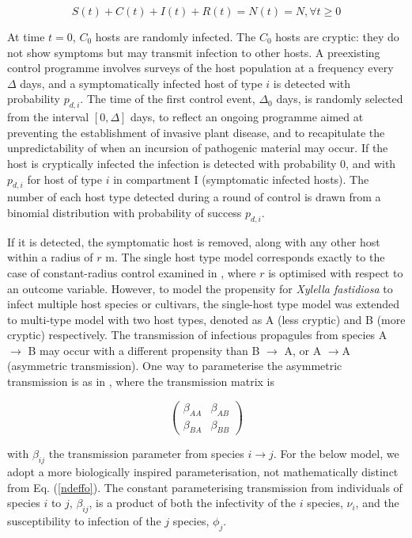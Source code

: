 \documentclass[11pt,letterpaper]{article}
\begin{document}
\begin{equation}
	S(t) + C(t) + I(t) + R(t) = N(t) = N,   \forall t \ge 0 
\end{equation}

At time $t = 0$, $C_0$ hosts are randomly infected. The $C_{0}$ hosts are cryptic: they do not show symptoms but may transmit infection to other hosts. A preexisting control programme involves surveys of the host population at a frequency every $\Delta$ days, and a symptomatically infected host of type $i$ is detected with probability $p_{d,i}$. The time of the first control event, $\Delta_{0}$ days, is randomly selected from the interval $[0, \Delta]$ days, to reflect an ongoing programme aimed at preventing the establishment of invasive plant disease, and to recapitulate the unpredictability of when an incursion of pathogenic material may occur. If the host is cryptically infected the infection is detected with probability 0, and with $p_{d, i}$ for host of type $i$ in compartment I (symptomatic infected hosts). The number of each host type detected during a round of control is drawn from a binomial distribution with probability of success $p_{d,i}$.

If it is detected, the symptomatic host is removed, along with any other host within a radius of $r$ m. The single host type model corresponds exactly to the case of constant-radius control examined in \cite{HyattTwynam2017}, where $r$ is optimised with respect to an outcome variable. However, to model the propensity for \emph{Xylella fastidiosa} to infect multiple host species or cultivars, the single-host type model was extended to multi-type model with two host types, denoted as A (less cryptic) and B (more cryptic) respectively. The transmission of infectious propagules from species A $\rightarrow$ B may occur with a different propensity than B $\rightarrow$ A, or A $\rightarrow $A (asymmetric transmission). One way to parameterise the asymmetric transmission is as in \cite{NdeffoMbah2010}, where the transmission matrix is 

\begin{equation}
\label{ndeffo}
\begin{pmatrix}
\beta_{AA} & \beta_{AB} \\
\beta_{BA} & \beta_{BB}
\end{pmatrix} 
\end{equation}

with $\beta_{ij}$ the transmission parameter from species $i \rightarrow j$. For the below model, we adopt a more biologically inspired parameterisation, not mathematically distinct from Eq. (\ref{ndeffo}). The constant parameterising transmission from individuals of species $i$ to $j$, $\beta_{ij}$, is a product of both the infectivity of the $i$ species, $\nu_{i}$, and  the susceptibility to infection of the $j$ species, $\phi_{j}$.
\end{document}
